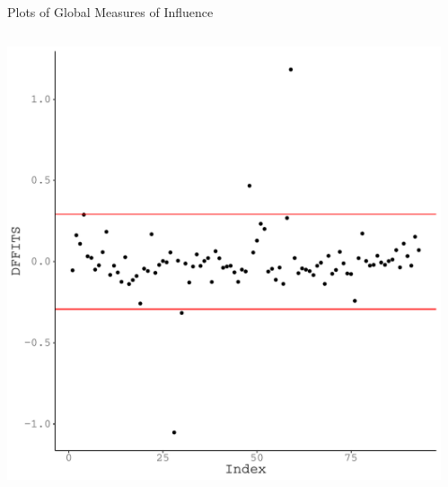 \documentclass{beamer}\usepackage[]{graphicx}\usepackage[]{color}
\makeatletter
\def\maxwidth{ %
  \ifdim\Gin@nat@width>\linewidth
    \linewidth
  \else
    \Gin@nat@width
  \fi
}
\newenvironment{knitrout}{}{} %
\makeatother
\begin{document}
\begin{frame}{Plots of Global Measures of Influence}
  
  \begin{columns}
    \begin{column}{0.5\textwidth}
      
\begin{knitrout}\footnotesize
{}\color{fgcolor}

{\centering \includegraphics[width=\maxwidth]{figure/unnamed-chunk-30-1} 

}



\end{knitrout}

\end{column}
    
    \begin{column}{0.5\textwidth}

\begin{knitrout}\footnotesize
{}\color{fgcolor}


\end{knitrout}
\end{column}
\end{columns}
\end{frame}
\end{document}
